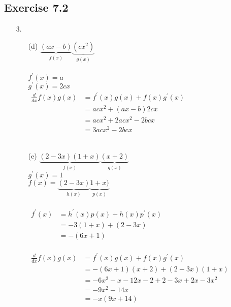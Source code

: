 \documentclass{./../../Latex/homework}
\begin{document}
\subsection*{Exercise 7.2} 
\begin{enumerate}

\item[3.] \begin{enumerate}
 \item[(d)] $\underbrace{(a x-b)}_{f(x)} \underbrace{\left(c x^{2}\right)}_{g(x)}$ \\~\\
$f^{\prime}(x) =a$ \\
$g^{\prime}(x)=2 c x$ \\


$\begin{aligned}
\frac{d}{d x} f(x) g(x) &=f^{\prime}(x) g(x)+f(x) g^{\prime}(x) \\
&=a c x^{2}+(a x-b) 2 c x \\
&=a c x^{2}+2 a c x^{2}-2 b c x \\
&=3 a c x^{2}-2 b c x
\end{aligned}$ \\~\\


\item[(e)] \(\underbrace{(2-3 x)(1+x)}_{f(x)} \underbrace{(x+2)}_{g(x)}\) \\

\(g^{\prime}(x) =1 \) \\

\( f(x) =\underbrace{(2-3 x)}_{h(x)} \underbrace{1+x)}_{p(x)} \) \\~\\

$\begin{aligned}
f^{\prime}(x) &=h^{\prime}(x) p(x)+h(x) p^{\prime}(x) \\
&=-3(1+x)+(2-3 x) \\
&=-(6 x+1)
\end{aligned}$ \\~\\

$\begin{aligned}
\frac{d}{d x} f(x) g(x) &=f^{\prime}(x) g(x)+f(x) g^{\prime}(x) \\
&=-(6 x+1)(x+2)+(2-3 x)(1+x) \\
&=-6 x^{2}-x-12 x-2+2-3 x+2 x-3 x^{2} \\
&=-9 x^{2}-14 x \\
&=-x(9 x+14)
\end{aligned}$
\end{enumerate}


\end{enumerate}
\end{document}
